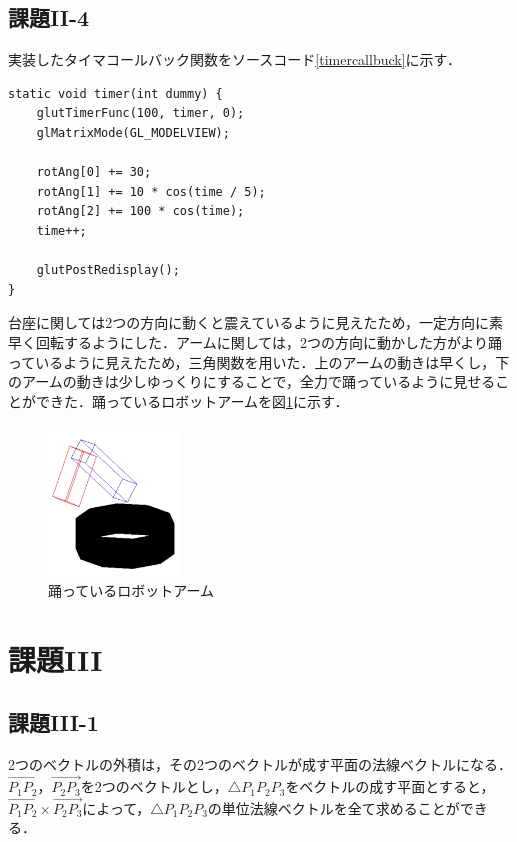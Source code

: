 \documentclass[]{jsarticle}
\begin{document}
\subsection{課題II-4}
実装したタイマコールバック関数をソースコード\ref{timercallbuck}に示す．
\begin{lstlisting}[caption=タイマコールバック関数,label=timercallbuck]
static void timer(int dummy) {
    glutTimerFunc(100, timer, 0);
    glMatrixMode(GL_MODELVIEW);

    rotAng[0] += 30;
    rotAng[1] += 10 * cos(time / 5);
    rotAng[2] += 100 * cos(time);
    time++;

    glutPostRedisplay();
}
\end{lstlisting}

台座に関しては2つの方向に動くと震えているように見えたため，一定方向に素早く回転するようにした．アームに関しては，2つの方向に動かした方がより踊っているように見えたため，三角関数を用いた．上のアームの動きは早くし，下のアームの動きは少しゆっくりにすることで，全力で踊っているように見せることができた．踊っているロボットアームを図\ref{fig:dance}に示す．
\begin{figure}[htbp]
\begin{center}
\includegraphics[height=4cm,keepaspectratio]{dance.jpg}
    \caption{踊っているロボットアーム}
    \label{fig:dance}
\end{center}
\end{figure}

\section{課題III}
\subsection{課題III-1}
2つのベクトルの外積は，その2つのベクトルが成す平面の法線ベクトルになる．$\overrightarrow{P_1 P_2}$，$\overrightarrow{P_2 P_3}$を2つのベクトルとし，$\triangle{P_1P_2P_3}$をベクトルの成す平面とすると，$\overrightarrow{P_1 P_2}\times\overrightarrow{P_2 P_3}$によって，$\triangle{P_1P_2P_3}$の単位法線ベクトルを全て求めることができる．
\end{document}
